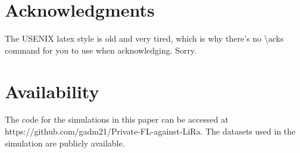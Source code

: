 \section*{Acknowledgments}

The USENIX latex style is old and very tired, which is why
there's no \textbackslash{}acks command for you to use when
acknowledging. Sorry.

\section*{Availability}

The code for the simulations in this paper can be accessed at https://github.com/gadm21/Private-FL-against-LiRa. The datasets used in the simulation are publicly available. 








